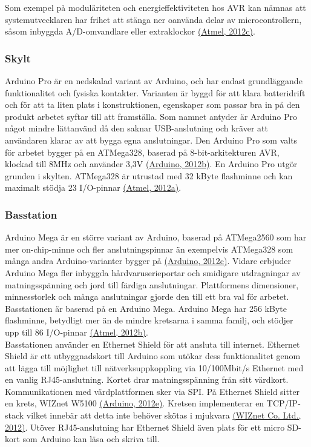 \documentclass[a4paper,11pt]{article}
\begin{document}
Som exempel på moduläriteten och energieffektiviteten hos AVR kan nämnas att systemutvecklaren har frihet att stänga ner oanvända delar av microcontrollern, såsom inbyggda A/D-omvandlare eller extraklockor \hyperref[atmel]{(Atmel, 2012c)}.

\subsubsection{Skylt}
\label{sec:skylt}
Arduino Pro är en nedskalad variant av Arduino, och har endast grundläggande funktionalitet och fysiska kontakter. Varianten är byggd för att klara batteridrift och för att ta liten plats i konstruktionen, egenskaper som passar bra in på den produkt arbetet syftar till att framställa. Som namnet antyder är Arduino Pro något mindre lättanvänd då den saknar USB-anslutning och kräver att användaren klarar av att bygga egna anslutningar. Den Arduino Pro som valts för arbetet bygger på en ATMega328, baserad på 8-bit-arkitekturen AVR, klockad till 8MHz och använder 3,3V \hyperref[arduino]{(Arduino, 2012b)}. En Arduino Pro utgör grunden i skylten. ATMega328 är utrustad med 32 kByte flashminne och kan maximalt stödja 23 I/O-pinnar \hyperref[atmel]{(Atmel, 2012a)}.

\subsubsection{Basstation}
Arduino Mega är en större variant av Arduino, baserad på ATMega2560 som har mer on-chip-minne och fler anslutningspinnar än exempelvis ATMega328 som många andra Arduino-varianter bygger på \hyperref[arduino]{(Arduino, 2012c)}. Vidare erbjuder Arduino Mega fler inbyggda hårdvaruserieportar och smidigare utdragningar av matningsspänning och jord till färdiga anslutningar. Plattformens dimensioner, minnesstorlek och många anslutningar gjorde den till ett bra val för arbetet. Basstationen är baserad på en Arduino Mega. Arduino Mega har 256 kByte flashminne, betydligt mer än de mindre kretsarna i samma familj, och stödjer upp till 86 I/O-pinnar \hyperref[atmel]{(Atmel, 2012b)}. \\

Basstationen använder en Ethernet Shield för att ansluta till internet. Ethernet Shield är ett utbyggnadskort till Arduino som utökar dess funktionalitet genom att lägga till möjlighet till nätverksuppkoppling via 10/100Mbit/s Ethernet med en vanlig RJ45-anslutning. Kortet drar matningsspänning från sitt värdkort. Kommunikationen med värdplattformen sker via SPI. På Ethernet Shield sitter en krets, WIZnet W5100 \hyperref[arduino]{(Arduino, 2012e)}. Kretsen implementerar en TCP/IP-stack vilket innebär att detta inte behöver skötas i mjukvara \hyperref[wiznet]{(WIZnet Co. Ltd., 2012)}. Utöver RJ45-anslutning har Ethernet Shield även plats för ett micro SD-kort som Arduino kan läsa och skriva till. \\
\end{document}
